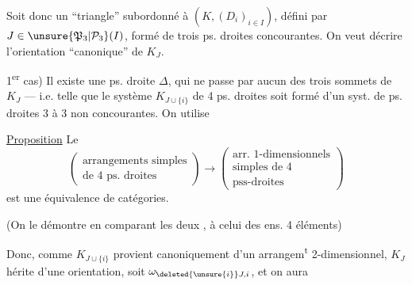 Soit donc un ``triangle'' subordonné à
$(K,(D_i)_{i\in I})$,  défini par $J\in\unsure{\mathfrak P_3|\mathcal P_3}(I)$, formé
de trois ps. droites concourantes. On
veut décrire  l'orientation ``canonique''
de $K_J$.

 1\textsuperscript{er} cas) Il existe une  ps. droite
\deleted{\unsure{$\Theta$}} $\Delta$, qui ne passe par aucun des
trois sommets de $K_J$ — i.e. telle que
le système $K_{J\cup\{i\}}$ de 4 ps. droites
soit formé d'un syst. de  ps. droites
3 à 3 non concourantes. On utilise

\uline{Proposition} Le  
 
\[\left(\begin{gathered}\text{arrangements simples}\\\text{de 4 ps. droites}\end{gathered}\right)
\longrightarrow
\left(\begin{gathered}\text{arr. 1-dimensionnels}\\\text{simples de 4}\\\text{pss-droites}\end{gathered}\right)\]
est une équivalence de catégories.

(On le démontre en comparant les
deux , à celui des ens.  
4 éléments)

Donc, comme $K_{J\cup\{i\}}$ provient canoniquement
d'un arrangem\textsuperscript{t} 2-dimensionnel, $K_J$ hérite
d'une orientation, soit $\omega_{\deleted{\unsure{i}}J,i}$, et on aura
